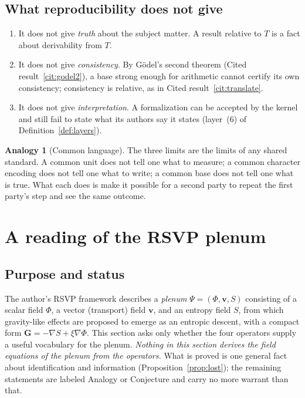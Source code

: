 \documentclass[11pt]{article}
\theoremstyle{definition}
\newtheorem{analogy}[definition]{Analogy}
\theoremstyle{plain}
\theoremstyle{remark}
\begin{document}
\subsection{What reproducibility does not give}

\begin{enumerate}[label=(\roman*)]
\item It does not give \emph{truth} about the subject matter. A result relative to $T$ is a fact about derivability from $T$.
\item It does not give \emph{consistency}. By G\"odel's second theorem (Cited result~\ref{cit:godel2}), a base strong enough for arithmetic cannot certify its own consistency; consistency is relative, as in Cited result~\ref{cit:translate}.
\item It does not give \emph{interpretation}. A formalization can be accepted by the kernel and still fail to state what its authors say it states (layer~(6) of Definition~\ref{def:layers}).
\end{enumerate}

\begin{analogy}[Common language]\label{an:commonlang}
The three limits are the limits of any shared standard. A common unit does not tell one what to measure; a common character encoding does not tell one what to write; a common base does not tell one what is true. What each does is make it possible for a second party to repeat the first party's step and see the same outcome.
\end{analogy}

\section{A reading of the RSVP plenum}\label{sec:rsvp}

\subsection{Purpose and status}

The author's RSVP framework describes a \emph{plenum} $\Psi=(\Phi,\mathbf v,S)$ consisting of a scalar field $\Phi$, a vector (transport) field $\mathbf v$, and an entropy field $S$, from which gravity-like effects are proposed to emerge as an entropic descent, with a compact form $\mathbf G=-\nabla S+\xi\nabla\Phi$. This section asks only whether the four operators supply a useful vocabulary for the plenum. \emph{Nothing in this section derives the field equations of the plenum from the operators.} What is proved is one general fact about identification and information (Proposition~\ref{prop:lost}); the remaining statements are labeled Analogy or Conjecture and carry no more warrant than that.
\end{document}
